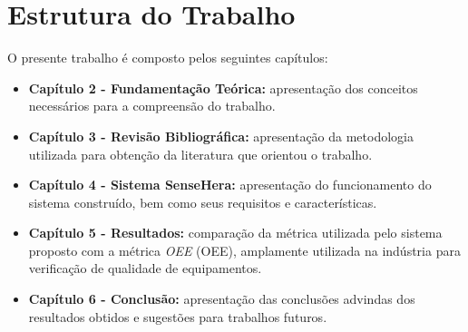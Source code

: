 \section{Estrutura do Trabalho}
O presente trabalho é composto pelos seguintes capítulos:
\begin{itemize}
  \item \textbf{Capítulo 2 - Fundamentação Teórica:} apresentação dos conceitos necessários para a compreensão do
  trabalho.
  \item \textbf{Capítulo 3 - Revisão Bibliográfica:} apresentação da metodologia utilizada para obtenção da literatura que orientou o trabalho.
  \item \textbf{Capítulo 4 - Sistema SenseHera:} apresentação do funcionamento do sistema construído, bem como seus requisitos e características.
  \item \textbf{Capítulo 5 - Resultados:} comparação da métrica utilizada pelo sistema proposto com a métrica \textit{\acrlong{OEE}} (\acrshort{OEE}), amplamente utilizada na indústria para verificação de qualidade de equipamentos.
  \item \textbf{Capítulo 6 - Conclusão:} apresentação das conclusões advindas dos resultados obtidos e
  sugestões para trabalhos futuros.
\end{itemize}
